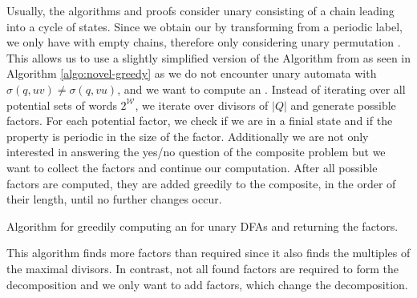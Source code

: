Usually, the algorithms and proofs consider unary \DFAs consisting of a chain leading into a cycle of states.
Since we obtain our \DFAs by transforming from a periodic label, we only have \DFAs with empty chains, therefore only considering unary permutation \DFA.
This allows us to use a slightly simplified version of the Algorithm from \cite{DBLP:journals/corr/abs-2107-04683} as seen in Algorithm \ref{algo:novel-greedy} as we do not encounter unary automata with $\sigma(q, uv) \not = \sigma(q, vu)$, and we want to compute an \orDecomp.
Instead of iterating over all potential sets of words $2^\mathcal{W}$, we iterate over divisors of $|Q|$ and generate possible factors.
For each potential factor, we check if we are in a finial state and if the property is periodic in the size of the factor.
Additionally we are not only interested in answering the yes/no question of the composite problem but we want to collect the factors and continue our computation.
After all possible factors are computed, they are added greedily to the composite, in the order of their length, until no further changes occur.
\begin{algorithm}[h]
	\DontPrintSemicolon
	
	
	\caption{Algorithm for greedily computing an \orDecomp for unary DFAs and returning the factors.}
	\label{algo:novel-greedy}
\end{algorithm}
This algorithm finds more factors than required since it also finds the multiples of the maximal divisors.
In contrast, not all found factors are required to form the decomposition and we only want to add factors, which change the decomposition.
